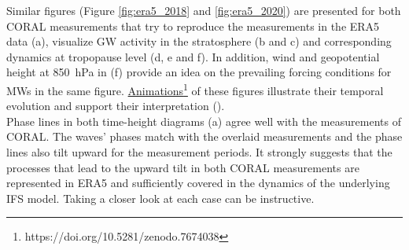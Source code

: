 Similar figures (Figure \ref{fig:era5_2018} and \ref{fig:era5_2020}) are presented for both CORAL measurements that try to reproduce the measurements in the ERA5 data (a), visualize GW activity in the stratosphere (b and c) and corresponding dynamics at tropopause level (d, e and f). In addition, wind and geopotential height at \SI{850}{hPa} in (f) provide an idea on the prevailing forcing conditions for MWs in the same figure. \href{https://doi.org/10.5281/zenodo.7674038}{Animations}\footnote[3]{https://doi.org/10.5281/zenodo.7674038} of these figures illustrate their temporal evolution and support their interpretation (\cite{binder_era5_2023}).\\
Phase lines in both time-height diagrams (a) agree well with the measurements of CORAL. The waves' phases match with the overlaid measurements and the phase lines also tilt upward for the measurement periods. It strongly suggests that the processes that lead to the upward tilt in both CORAL measurements are represented in ERA5 and sufficiently covered in the dynamics of the underlying IFS model. Taking a closer look at each case can be instructive.

